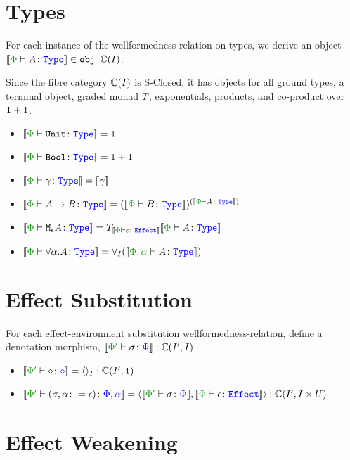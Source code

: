 \documentclass{report}
\begin{document}
\section{Types}
  
For each instance of the wellformedness relation on types, we derive an object $\deno{\typerelation{\P}{A}{\type}}\in\obj\C(I)$.

Since the fibre category $\mathbb{C}(I)$ is S-Closed, it has objects for all ground types, a terminal object, graded monad $T_{}{}$, exponentials, products, and co-product over $\texttt{1}+\texttt{1}$.

\begin{itemize}
    \item $\deno{\typerelation{\P}{\U}{\type}} = \1$
    
    \item $\deno{\typerelation{\P}{\B}{\type}} = \1+\1$
    
    \item $\deno{\typerelation{\P}{\g}{\type}} = \deno{\g} $
    
    \item $\deno{\typerelation{\P}{\ab}{\type}} = (\deno{\typerelation{\P}{B}{\type}})^{(\deno{\typerelation{\P}{A}{\type}})}$
    
    \item $\deno{\typerelation{\P}{\mea}{\type}} =\T{\deno{\typerelation{\P}{\e}{\effect}}}{\deno{\typerelation{\P}{A}{\type}}}$
    \item $\deno{\typerelation{\P}{\all{\a}{A}}{\type}} =\allI(\deno{\typerelation{\P,\a}{A}{\type}})$
\end{itemize}

\section{Effect Substitution}
For each effect-environment substitution wellformedness-relation, define a denotation morphism, $\deno{\typerelation{\P'}{\si}{\P}}: \cii$

\begin{itemize}
    \item $\deno{\typerelation{\P'}{\nil}{\nil}} = \term{I}: \C(I', \1)$
    \item $\deno{\typerelation{\P'}{(\si, \a\setto\e)}{\P,\a}} = \pr{\deno{\typerelation{\P'}{\si}{\P}}}{\deno{\typerelation{\P}{\e}{\effect}}}: \C(I', I\times U)$
\end{itemize}

\section{Effect Weakening}
\end{document}
